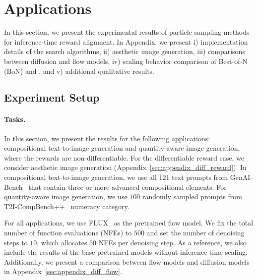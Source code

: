 % 

% 
% 
\vspace{-0.6\baselineskip}
\section{Applications}
\vspace{-0.6\baselineskip}
\label{sec:applications}
In this section, we present the experimental results of particle sampling methods for inference-time reward alignment. 
In Appendix, we present i) implementation details of the search algorithms, ii) aesthetic image generation, iii) comparisons between diffusion and flow models, iv) scaling behavior comparison of Best-of-N (BoN) and \Ours{}, and v) additional qualitative results. 
% 
\vspace{-0.3\baselineskip}
\subsection{Experiment Setup} 
\vspace{-0.3\baselineskip}
\paragraph{Tasks.}
In this section, we present the results for the following applications: compositional text-to-image generation and quantity-aware image generation, where the rewards are non-differentiable. 
For the differentiable reward case, we consider aesthetic image generation (Appendix~\ref{sec:appendix_diff_reward}). 
In compositional text-to-image generation, we use all $121$ text prompts from GenAI-Bench~\cite{Jiang:2024GenAI} that contain three or more advanced compositional elements. 
For quantity-aware image generation, we use $100$ randomly sampled prompts from T2I-CompBench++~\cite{Huang:2025T2ICompBench++} numeracy category. 

For all applications, we use FLUX~\cite{BlackForestLabs:2024Flux} as the pretrained flow model. We fix the total number of function evaluations (NFEs) to $500$ and set the number of denoising steps to $10$, which allocates $50$ NFEs per denoising step. As a reference, we also include the results of the base pretrained models without inference-time scaling. Additionally, we present a comparison between flow models and diffusion models in Appendix~\ref{sec:appendix_diff_flow}. 
% 
% 
\vspace{-0.5\baselineskip}
